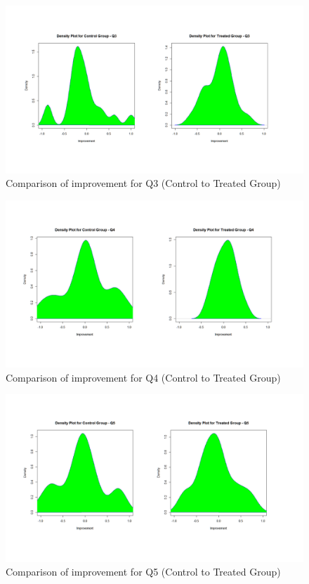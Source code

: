 \begin{figure}
	\centering
	\includegraphics[width=1\textwidth]{figures/Control-Treated_q3}
	\caption{Comparison of improvement for Q3 (Control to Treated Group)}
	\label{fig:Control-Treated_q3}
\end{figure}

\begin{figure}
	\centering
	\includegraphics[width=1\textwidth]{figures/Control-Treated_q4}
	\caption{Comparison of improvement for Q4 (Control to Treated Group)}
	\label{fig:Control-Treated_q4}
\end{figure}

\begin{figure}
	\centering
	\includegraphics[width=1\textwidth]{figures/Control-Treated_q5}
	\caption{Comparison of improvement for Q5 (Control to Treated Group)}
	\label{fig:Control-Treated_q5}
\end{figure}

